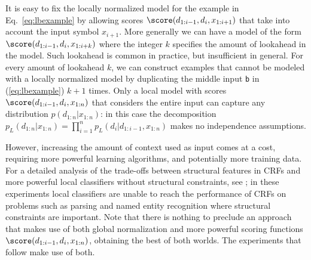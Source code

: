 It is easy to fix the locally normalized model for the example
in Eq.~\eqref{eq:lbexample} by
allowing scores $\score(d_{1:i-1}, d_i, x_{1:i+1})$ that 
take into account the input symbol $x_{i+1}$. 
More generally we can have a model of the form $\score(d_{1:i-1}, d_i, x_{1:i+k})$
where the integer $k$ specifies the amount of lookahead in the model.
Such lookahead is common in practice, but insufficient in general.
For every amount of lookahead $k$, 
we can construct examples that cannot be modeled
with a locally normalized model
by duplicating the middle input {\tt b} in (\ref{eq:lbexample}) $k+1$ times.
Only a local model with scores
$\score(d_{1:i-1}, d_i, x_{1:n})$ that considers the entire
input can capture any distribution $p(d_{1:n} | x_{1:n})$:
in this case the decomposition
$ p_L(d_{1:n} | x_{1:n}) = \prod_{i=1}^n p_L(d_i | d_{1:i-1}, x_{1:n}) $
makes no independence assumptions.

However, increasing the amount of context used as input comes
at a cost, requiring more powerful learning algorithms, and
potentially more training data. For a detailed analysis of the trade-offs
between structural features in CRFs and more powerful local classifiers
without structural constraints,
see ; in these experiments local classifiers
are unable to reach the performance of CRFs on problems such as parsing
and named entity recognition where structural constraints are important.
Note that there is nothing to preclude an approach that makes use of
both global normalization and more powerful scoring functions
$\score(d_{1:i-1}, d_i, x_{1:n})$, obtaining the best of both worlds.
The experiments that follow make use of both.
